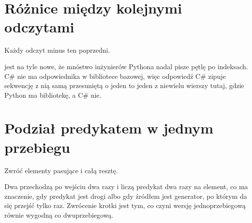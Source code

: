 \section{Różnice między kolejnymi odczytami}
\label{sec:appD-pairwise}

\noindent
Każdy odczyt minus ten poprzedni.



\noindent
{} jest na tyle nowe, że mnóstwo inżynierów Pythona nadal pisze pętlę po indeksach. C\# nie ma odpowiednika w bibliotece bazowej, więc odpowiedź C\# zipuje sekwencję z nią samą przesuniętą o jeden \dash{} to jeden z niewielu wierszy tutaj, gdzie Python ma bibliotekę, a C\# nie.

\section{Podział predykatem w jednym przebiegu}
\label{sec:appD-partition}

\noindent
Zwróć elementy pasujące i całą resztę.



\noindent
Dwa  przechodzą po wejściu dwa razy i liczą predykat dwa razy na element, co ma znaczenie, gdy predykat jest drogi albo gdy źródłem jest generator, po którym da się przejść tylko raz. Zwrócenie krotki jest tym, co czyni wersję jednoprzebiegową równie wygodną co dwuprzebiegową.

